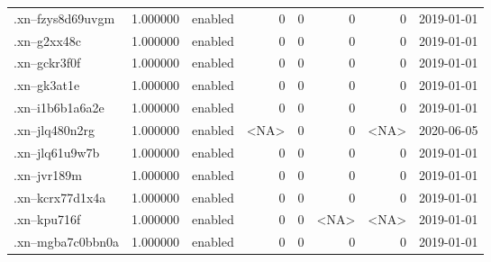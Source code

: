 \begin{tabular}{lrlrrrrl}
.xn--fzys8d69uvgm         &          1.000000 &         enabled &                           0 &                           0 &                           0 &                   0 &           2019-01-01 \\
.xn--g2xx48c              &          1.000000 &         enabled &                           0 &                           0 &                           0 &                   0 &           2019-01-01 \\
.xn--gckr3f0f             &          1.000000 &         enabled &                           0 &                           0 &                           0 &                   0 &           2019-01-01 \\
.xn--gk3at1e              &          1.000000 &         enabled &                           0 &                           0 &                           0 &                   0 &           2019-01-01 \\
.xn--i1b6b1a6a2e          &          1.000000 &         enabled &                           0 &                           0 &                           0 &                   0 &           2019-01-01 \\
.xn--jlq480n2rg           &          1.000000 &         enabled &                        <NA> &                           0 &                           0 &                <NA> &           2020-06-05 \\
.xn--jlq61u9w7b           &          1.000000 &         enabled &                           0 &                           0 &                           0 &                   0 &           2019-01-01 \\
.xn--jvr189m              &          1.000000 &         enabled &                           0 &                           0 &                           0 &                   0 &           2019-01-01 \\
.xn--kcrx77d1x4a          &          1.000000 &         enabled &                           0 &                           0 &                           0 &                   0 &           2019-01-01 \\
.xn--kpu716f              &          1.000000 &         enabled &                           0 &                           0 &                        <NA> &                <NA> &           2019-01-01 \\
.xn--mgba7c0bbn0a         &          1.000000 &         enabled &                           0 &                           0 &                           0 &                   0 &           2019-01-01 \\

\end{tabular}
